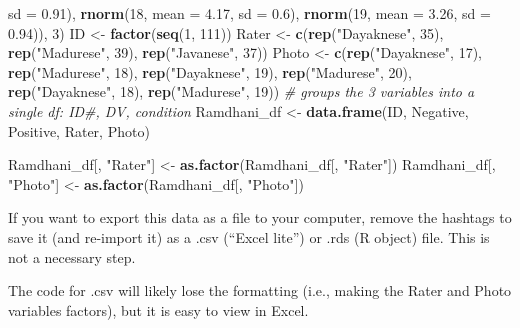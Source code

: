 \documentclass[
  11pt,
]{book}
\newenvironment{Shaded}{\begin{snugshade}}{\end{snugshade}}
\newcommand{\AttributeTok}[1]{\textcolor[rgb]{0.27,0.27,0.27}{#1}}
\newcommand{\CommentTok}[1]{\textcolor[rgb]{0.37,0.37,0.37}{\textit{#1}}}
\newcommand{\DecValTok}[1]{\textcolor[rgb]{0.06,0.06,0.06}{#1}}
\newcommand{\FloatTok}[1]{\textcolor[rgb]{0.06,0.06,0.06}{#1}}
\newcommand{\FunctionTok}[1]{\textcolor[rgb]{0.27,0.27,0.27}{\textbf{#1}}}
\newcommand{\NormalTok}[1]{#1}
\newcommand{\OtherTok}[1]{\textcolor[rgb]{0.37,0.37,0.37}{#1}}
\newcommand{\StringTok}[1]{\textcolor[rgb]{0.5,0.5,0.5}{#1}}
\begin{document}
\begin{Shaded}
\begin{Highlighting}[]
    \AttributeTok{sd =} \FloatTok{0.91}\NormalTok{), }\FunctionTok{rnorm}\NormalTok{(}\DecValTok{18}\NormalTok{, }\AttributeTok{mean =} \FloatTok{4.17}\NormalTok{, }\AttributeTok{sd =} \FloatTok{0.6}\NormalTok{), }\FunctionTok{rnorm}\NormalTok{(}\DecValTok{19}\NormalTok{, }\AttributeTok{mean =} \FloatTok{3.26}\NormalTok{,}
    \AttributeTok{sd =} \FloatTok{0.94}\NormalTok{)), }\DecValTok{3}\NormalTok{)}
\NormalTok{ID }\OtherTok{\textless{}{-}} \FunctionTok{factor}\NormalTok{(}\FunctionTok{seq}\NormalTok{(}\DecValTok{1}\NormalTok{, }\DecValTok{111}\NormalTok{))}
\NormalTok{Rater }\OtherTok{\textless{}{-}} \FunctionTok{c}\NormalTok{(}\FunctionTok{rep}\NormalTok{(}\StringTok{"Dayaknese"}\NormalTok{, }\DecValTok{35}\NormalTok{), }\FunctionTok{rep}\NormalTok{(}\StringTok{"Madurese"}\NormalTok{, }\DecValTok{39}\NormalTok{), }\FunctionTok{rep}\NormalTok{(}\StringTok{"Javanese"}\NormalTok{, }\DecValTok{37}\NormalTok{))}
\NormalTok{Photo }\OtherTok{\textless{}{-}} \FunctionTok{c}\NormalTok{(}\FunctionTok{rep}\NormalTok{(}\StringTok{"Dayaknese"}\NormalTok{, }\DecValTok{17}\NormalTok{), }\FunctionTok{rep}\NormalTok{(}\StringTok{"Madurese"}\NormalTok{, }\DecValTok{18}\NormalTok{), }\FunctionTok{rep}\NormalTok{(}\StringTok{"Dayaknese"}\NormalTok{,}
    \DecValTok{19}\NormalTok{), }\FunctionTok{rep}\NormalTok{(}\StringTok{"Madurese"}\NormalTok{, }\DecValTok{20}\NormalTok{), }\FunctionTok{rep}\NormalTok{(}\StringTok{"Dayaknese"}\NormalTok{, }\DecValTok{18}\NormalTok{), }\FunctionTok{rep}\NormalTok{(}\StringTok{"Madurese"}\NormalTok{, }\DecValTok{19}\NormalTok{))}
\CommentTok{\# groups the 3 variables into a single df: ID\#, DV, condition}
\NormalTok{Ramdhani\_df }\OtherTok{\textless{}{-}} \FunctionTok{data.frame}\NormalTok{(ID, Negative, Positive, Rater, Photo)}

\NormalTok{Ramdhani\_df[, }\StringTok{"Rater"}\NormalTok{] }\OtherTok{\textless{}{-}} \FunctionTok{as.factor}\NormalTok{(Ramdhani\_df[, }\StringTok{"Rater"}\NormalTok{])}
\NormalTok{Ramdhani\_df[, }\StringTok{"Photo"}\NormalTok{] }\OtherTok{\textless{}{-}} \FunctionTok{as.factor}\NormalTok{(Ramdhani\_df[, }\StringTok{"Photo"}\NormalTok{])}
\end{Highlighting}
\end{Shaded}

If you want to export this data as a file to your computer, remove the hashtags to save it (and re-import it) as a .csv (``Excel lite'') or .rds (R object) file. This is not a necessary step.

The code for .csv will likely lose the formatting (i.e., making the Rater and Photo variables factors), but it is easy to view in Excel.
\end{document}

